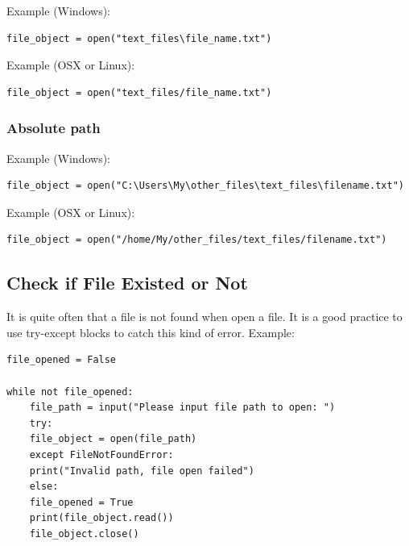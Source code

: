 \documentclass[12pt]{book}
\begin{document}
Example (Windows):
\begin{verbatim}
file_object = open("text_files\file_name.txt")
\end{verbatim}
Example (OSX or Linux):
\begin{verbatim}
file_object = open("text_files/file_name.txt")
\end{verbatim}
\subsubsection{Absolute path}
\label{sec:org65d5628}
Example (Windows):
\begin{verbatim}
file_object = open("C:\Users\My\other_files\text_files\filename.txt")
\end{verbatim}
Example (OSX or Linux):
\begin{verbatim}
file_object = open("/home/My/other_files/text_files/filename.txt")
\end{verbatim}
\subsection{Check if File Existed or Not}
\label{sec:org8c5bb22}
It is quite often that a file is not found when open a file. It is a good practice to use try-except blocks to catch this kind of error. Example:
\begin{verbatim}
file_opened = False

while not file_opened:
    file_path = input("Please input file path to open: ")
    try:
	file_object = open(file_path)
    except FileNotFoundError:
	print("Invalid path, file open failed")
    else:
	file_opened = True
	print(file_object.read())
	file_object.close()
\end{verbatim}
\end{document}
